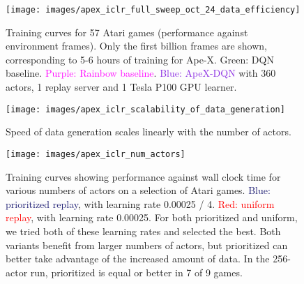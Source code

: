 \documentclass{article} \PassOptionsToPackage{usenames,dvipsnames}{xcolor}
\def\apex{Ape-X}
\def\smallcaption#1{\caption{\small #1}\vspace{-0.4cm}}
\begin{document}
\begin{figure}
    \centering
    \texttt{[image: images/apex\_iclr\_full\_sweep\_oct\_24\_data\_efficiency]} 
    \smallcaption{Training curves for 57 Atari games (performance against environment frames). Only the first billion frames are shown, corresponding to 5-6 hours of training for \apex. \textcolor{OliveGreen}{Green: DQN baseline}. \textcolor{Fuchsia}{Purple: Rainbow baseline}. \textcolor{BlueViolet}{Blue: ApeX-DQN} with 360 actors, 1 replay server and 1 Tesla P100 GPU learner.}
    \label{fig:atari_57_games_data_efficiency}
\end{figure}

\begin{figure}
    \centering
    \texttt{[image: images/apex\_iclr\_scalability\_of\_data\_generation]}
    \smallcaption{Speed of data generation scales linearly with the number of actors.}
    \label{fig:scalability_of_data_generation}
\end{figure}

\begin{figure}
    \centering
    \texttt{[image: images/apex\_iclr\_num\_actors]}
    \smallcaption{Training curves showing performance against wall clock time for various numbers of actors on a selection of Atari games. \textcolor{MidnightBlue}{Blue: prioritized replay}, with learning rate 0.00025 / 4. \textcolor{red}{Red: uniform replay}, with learning rate 0.00025. For both prioritized and uniform, we tried both of these learning rates and selected the best. Both variants benefit from larger numbers of actors, but prioritized can better take advantage of the increased amount of data. In the 256-actor run, prioritized is equal or better in 7 of 9 games.}
    \label{fig:num_actors}
\end{figure}
\end{document}
